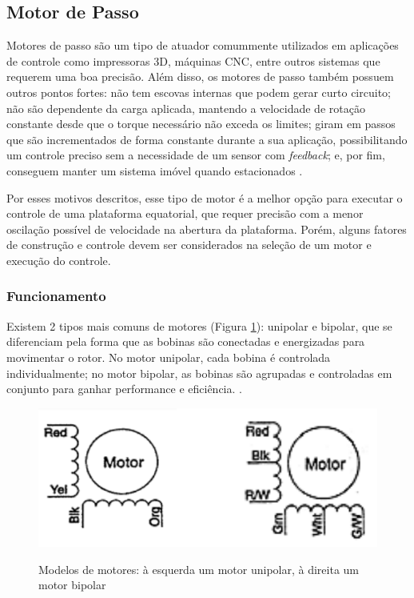 \subsection{Motor de Passo}

Motores de passo são um tipo de atuador comummente utilizados em aplicações de controle como impressoras 3D, máquinas CNC, entre outros sistemas que requerem uma boa precisão. Além disso, os motores de passo também possuem outros pontos fortes: não tem escovas internas que podem gerar curto circuito; não são dependente da carga aplicada, mantendo a velocidade de rotação constante desde que o torque necessário não exceda os limites; giram em passos que são incrementados de forma constante durante a sua aplicação, possibilitando um controle preciso sem a necessidade de um sensor com \textit{feedback}; e, por fim, conseguem manter um sistema imóvel quando estacionados \cite{manual:stepperMicrochip}.

Por esses motivos descritos, esse tipo de motor é a melhor opção para executar o controle de uma plataforma equatorial, que requer precisão com a menor oscilação possível de velocidade na abertura da plataforma. Porém, alguns fatores de construção e controle devem ser considerados na seleção de um motor e execução do controle. 

\subsubsection{Funcionamento}
Existem 2 tipos mais comuns de motores (Figura \ref{fig:stepper_polar}): unipolar e bipolar, que se diferenciam pela forma que as bobinas são conectadas e energizadas para movimentar o rotor. No motor unipolar, cada bobina é controlada individualmente; no motor bipolar, as bobinas são agrupadas e controladas em conjunto para ganhar performance e eficiência. \cite{man:advancedmicrosystemStepControl}.

\begin{figure}[!htb]
	\centering
	\caption{Modelos de motores: à esquerda um motor unipolar, à direita um motor bipolar}
	\includegraphics[width=.7\linewidth]{figuras/stepper_polar}
	\label{fig:stepper_polar}
\end{figure}

